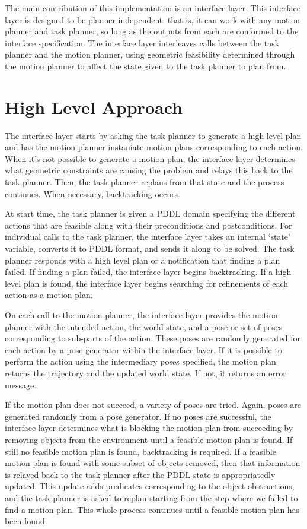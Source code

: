 \documentclass[12pt]{article}
\begin{document}
The main contribution of this implementation is an interface layer.  
This interface layer is designed to be planner-independent: that is, it can work with any motion planner and task planner, so long as the outputs from each are conformed to the interface specification.  
The interface layer interleaves calls between the task planner and the motion planner, using geometric feasibility determined through the motion planner to affect the state given to the task planner to plan from.




\section{High Level Approach}

The interface layer starts by asking the task planner to generate a high level plan and has the motion planner instaniate motion plans corresponding to each action.  
When it's not possible to generate a motion plan, the interface layer determines what geometric constraints are causing the problem and relays this back to the task planner.  
Then, the task planner replans from that state and the process continues.  
When necessary, backtracking occurs.
 
At start time, the task planner is given a PDDL domain specifying the different actions that are feasible along with their preconditions and postconditions.  
For individual calls to the task planner, the interface layer takes an internal `state' variable, converts it to PDDL format, and sends it along to be solved.  
The task planner responds with a high level plan or a notification that finding a plan failed.  
If finding a plan failed, the interface layer begins backtracking.  
If a high level plan is found, the interface layer begins searching for refinements of each action as a motion plan.

On each call to the motion planner, the interface layer provides the motion planner with the intended action, the world state, and a pose or set of poses  
corresponding to sub-parts of the action. These poses are randomly generated for each action by a pose generator within the interface layer. 
If it is possible to perform the action using the intermediary poses specified, the motion plan returns the trajectory and the updated world state.  
If not, it returns an error message.

If the motion plan does not succeed, a variety of poses are tried.  
Again, poses are generated randomly from a pose generator.  
If no poses are successful, the interface layer determines what is blocking the motion plan from succeeding by removing objects from the environment until a feasible motion plan is found.  
If still no feasible motion plan is found, backtracking is required.  
If a feasible motion plan is found with some subset of objects removed, then that information is relayed back to the task planner after the PDDL state is appropriatedly updated.
This update adds predicates corresponding to the object obstructions, and the task planner is asked to replan starting from the step where we failed to find a motion plan. This whole process continues until a feasible motion plan has been found.  
\end{document}
